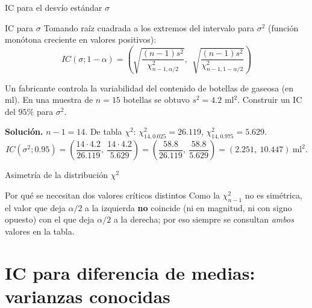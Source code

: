 \documentclass[aspectratio=169,11pt]{beamer}
\begin{document}
\begin{frame}{IC para el desvío estándar $\sigma$}
\begin{block}{IC para $\sigma$}
Tomando raíz cuadrada a los extremos del intervalo para $\sigma^2$ (función monótona creciente en valores positivos):
\[
IC(\sigma;1-\alpha) = \left(\sqrt{\frac{(n-1)s^2}{\chi^2_{n-1,\alpha/2}}},\ \ \sqrt{\frac{(n-1)s^2}{\chi^2_{n-1,1-\alpha/2}}}\right)
\]
\end{block}

\begin{example}
Un fabricante controla la variabilidad del contenido de botellas de gaseosa (en ml). En una muestra de $n=15$ botellas se obtuvo $s^2 = 4.2$ ml$^2$. Construir un IC del $95\%$ para $\sigma^2$.

\textbf{Solución.} $n-1=14$. De tabla $\chi^2$: $\chi^2_{14,0.025}=26.119$, $\chi^2_{14,0.975}=5.629$.
\[
IC(\sigma^2;0.95) = \left(\frac{14\cdot 4.2}{26.119},\ \frac{14\cdot 4.2}{5.629}\right) = \left(\frac{58.8}{26.119},\ \frac{58.8}{5.629}\right) = (2.251,\ 10.447)\ \text{ml}^2.
\]
\end{example}
\end{frame}

\begin{frame}{Asimetría de la distribución $\chi^2$}
\begin{center}
\end{center}
\begin{block}{Por qué se necesitan dos valores críticos distintos}
Como la $\chi^2_{n-1}$ no es simétrica, el valor que deja $\alpha/2$ a la izquierda \textbf{no} coincide (ni en magnitud, ni con signo opuesto) con el que deja $\alpha/2$ a la derecha; por eso siempre se consultan \emph{ambos} valores en la tabla.
\end{block}
\end{frame}

\section{IC para diferencia de medias: varianzas conocidas}
\end{document}
